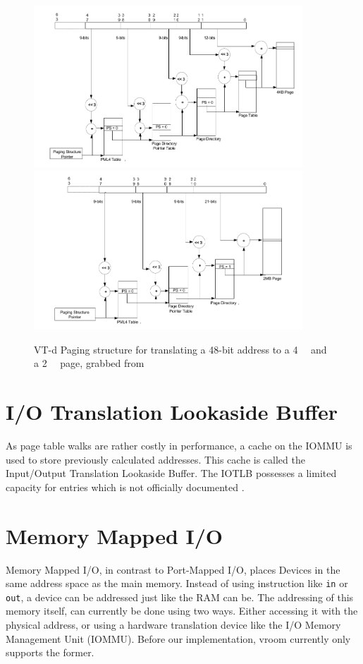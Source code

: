 \begin{figure}
    \centering
     {\includegraphics[width=0.9\textwidth]{figures/4kibtranslation.pdf}\label{fig:pagewalk4kib}}
     {\includegraphics[width=0.9\textwidth]{figures/2mibtranslation.pdf}\label{fig:pagewalk2mib}}
    \caption{VT-d Paging structure for translating a 48-bit address to a \qty{4}{\kibi\byte} and a \qty{2}{\mebi\byte} page, grabbed from \cite{vtdspec}}
    \label{fig:pagewalk}
\end{figure}


\section{I/O Translation Lookaside Buffer}
As page table walks are rather costly in performance, a cache on the IOMMU is used to store previously calculated addresses. This cache is called the Input/Output Translation Lookaside Buffer. The IOTLB possesses a limited capacity for entries which is not officially documented \cite{iommuhuber}.

\section{Memory Mapped I/O}
Memory Mapped I/O, in contrast to Port-Mapped I/O, places Devices in the same address space as the main memory. Instead of using instruction like \texttt{in} or \texttt{out}, a device can be addressed just like the RAM can be. The addressing of this memory itself, can currently be done using two ways. Either accessing it with the physical address, or using a hardware translation device like the I/O Memory Management Unit (IOMMU). Before our implementation, vroom currently only supports the former. %

